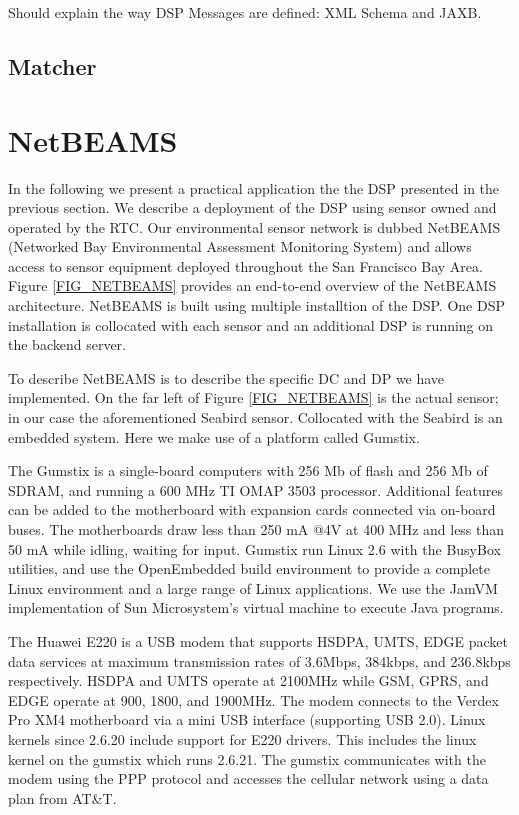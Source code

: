 \documentclass[conference]{IEEEtran}
\begin{document}
Should explain the way DSP Messages are defined: XML Schema and JAXB.

\subsection{Matcher}


\section{NetBEAMS}

In the following we present a practical application the the DSP
presented in the previous section. We describe a deployment of the DSP
using sensor owned and operated by the RTC. Our environmental sensor
network is dubbed NetBEAMS (Networked Bay Environmental Assessment
Monitoring System) and allows access to sensor equipment deployed
throughout the San Francisco Bay Area. Figure \ref{FIG_NETBEAMS}
provides an end-to-end overview of the NetBEAMS architecture. NetBEAMS
is built using multiple installtion of the DSP. One DSP installation
is collocated with each sensor and an additional DSP is running on the
backend server.

\begin{figure*}
\centering
{}
\caption{\label{FIG_NETBEAMS} NetBEAMS architecture.}
\end{figure*}

To describe NetBEAMS is to describe the specific DC and DP we have
implemented. On the far left of Figure \ref{FIG_NETBEAMS} is the
actual sensor; in our case the aforementioned Seabird sensor.
Collocated with the Seabird is an embedded system. Here we make use of
a platform called Gumstix. 

The Gumstix is a single-board computers with 256 Mb of flash and 256
Mb of SDRAM, and running a 600 MHz TI OMAP 3503 processor. Additional
features can be added to the motherboard with expansion cards
connected via on-board buses. The motherboards draw less than 250 mA
@4V at 400 MHz and less than 50 mA while idling, waiting for input.
Gumstix run Linux 2.6 with the BusyBox utilities, and use the
OpenEmbedded build environment to provide a complete Linux
environment and a large range of Linux applications. We use the JamVM
implementation of Sun Microsystem's virtual machine to execute Java
programs. 

The Huawei E220 is a USB modem that supports HSDPA, UMTS, EDGE packet
data services at maximum transmission rates of 3.6Mbps, 384kbps, and
236.8kbps respectively. HSDPA and UMTS operate at 2100MHz while GSM,
GPRS, and EDGE operate at 900, 1800, and 1900MHz. The modem connects
to the Verdex Pro XM4 motherboard via a mini USB interface (supporting
USB 2.0). Linux kernels since 2.6.20 include support for E220 drivers.
This includes the linux kernel on the gumstix which runs 2.6.21.  The
gumstix communicates with the modem using the PPP protocol and
accesses the cellular network using a data plan from AT\&T.
\end{document}
